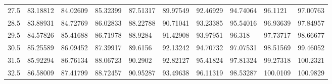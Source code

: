 \documentclass[10pt,twocolumn,letterpaper]{article}
\begin{document}
\begin{table}
{\begin{tabular}{llllllllll}
    27.5            & 83.18812                               & 84.02609                               & 85.32399                                & 87.51317                                & 89.97549                                & 92.46929                                & 94.74064                                & 96.1121                                 & 97.00763                                \\
    28.5            & 83.88931                               & 84.72769                               & 86.02833                                & 88.22788                                & 90.71041                                & 93.23385                                & 95.54016                                & 96.93639                                & 97.84957                                \\
    29.5            & 84.57826                               & 85.41688                               & 86.71978                                & 88.9284                                 & 91.42908                                & 93.97951                                & 96.318                                  & 97.73717                                & 98.66677                                \\
    30.5            & 85.25589                               & 86.09452                               & 87.39917                                & 89.6156                                 & 92.13242                                & 94.70732                                & 97.07531                                & 98.51569                                & 99.46052                                \\
    31.5            & 85.92294                               & 86.76134                               & 88.06723                                & 90.2902                                 & 92.82127                                & 95.41824                                & 97.81324                                & 99.27318                                & 100.2321                                \\
    32.5            & 86.58009                               & 87.41799                               & 88.72457                                & 90.95287                                & 93.49638                                & 96.11319                                & 98.53287                                & 100.0109                                & 100.9829                                \\

\end{tabular}}
\end{table}
\end{document}
